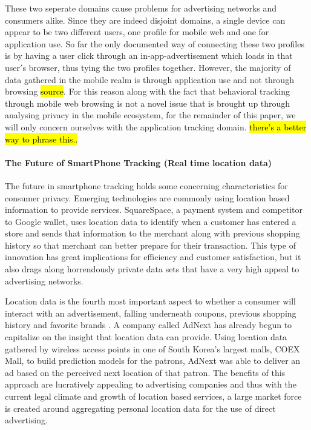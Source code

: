These two seperate domains cause problems for advertising networks and consumers alike. Since they are indeed disjoint domains, a single device can appear to be two different users, one profile for mobile web and one for application use. So far the only documented way of connecting these two profiles is by having a user click through an in-app-advertisement which loads in that user$'$s browser, thus tying the two profiles together\cite{Trust2013b}. 
However, the majority of data gathered in the mobile realm is through application use and not through browsing \hl{source}. For this reason along with the fact that behavioral tracking through mobile web browsing is not a novel issue that is brought up through analysing privacy in the mobile ecosystem, for the remainder of this paper, we will only concern ourselves with the application tracking domain. \hl{there's a better way to phrase this..} 

\paragraph{The Future of SmartPhone Tracking (Real time location data)}
The future in smartphone tracking holds some concerning characteristics for consumer privacy. Emerging technologies are commonly using location based information to provide services. SquareSpace, a payment system and competitor to Google wallet, uses location data to identify when a customer has entered a store and sends that information to the merchant along with previous shopping history so that merchant can better prepare for their transaction. This type of innovation has great implications for efficiency and customer satisfaction, but it also drags along horrendously private data sets that have a very high appeal to advertising networks.

Location data is the fourth most important aspect to whether a consumer will interact with an advertisement, falling underneath coupons, previous shopping history and favorite brands \cite{Abi2012}. A company called AdNext has already begun to capitalize on the insight that location data can provide. Using location data gathered by wireless access points in one of South Korea’s largest malls, COEX Mall, to build prediction models for the patrons, AdNext was able to deliver an ad based on the perceived next location of that patron\cite{adn2012}. The benefits of this approach are lucratively appealing to advertising companies and thus with the current legal climate and growth of location based services, a large market force is created around aggregating personal location data for the use of direct advertising.


